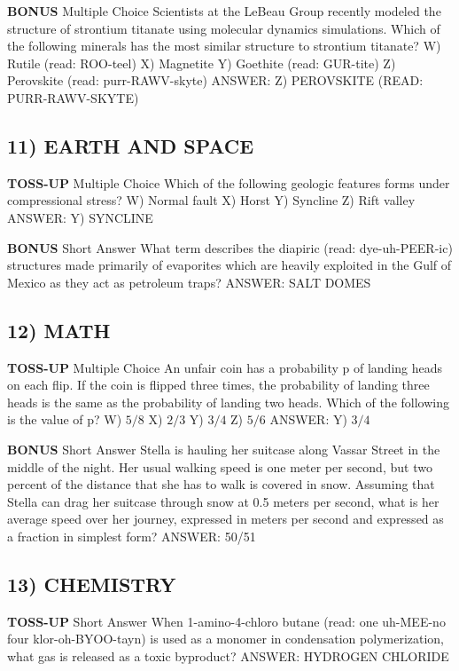 \documentclass{article}
\begin{document}
\textbf{BONUS}
Multiple Choice Scientists at the LeBeau Group recently modeled the structure of strontium titanate using molecular dynamics simulations. Which of the following minerals has the most similar structure to strontium titanate?
W) Rutile (read: ROO-teel)
X) Magnetite
Y) Goethite (read: GUR-tite)
Z) Perovskite (read: purr-RAWV-skyte)
ANSWER: Z) PEROVSKITE (READ: PURR-RAWV-SKYTE)

\subsection*{11) EARTH AND SPACE}
\textbf{TOSS-UP}
Multiple Choice Which of the following geologic features forms under compressional stress?
W) Normal fault
X) Horst
Y) Syncline
Z) Rift valley
ANSWER: Y) SYNCLINE

\textbf{BONUS}
Short Answer What term describes the diapiric (read: dye-uh-PEER-ic) structures made primarily of evaporites which are heavily exploited in the Gulf of Mexico as they act as petroleum traps?
ANSWER: SALT DOMES

\subsection*{12) MATH}
\textbf{TOSS-UP}
Multiple Choice An unfair coin has a probability p of landing heads on each flip. If the coin is flipped three times, the probability of landing three heads is the same as the probability of landing two heads. Which of the following is the value of p?
W) $5/8$
X) $2/3$
Y) $3/4$
Z) $5/6$
ANSWER: Y) $3/4$

\textbf{BONUS}
Short Answer Stella is hauling her suitcase along Vassar Street in the middle of the night. Her usual walking speed is one meter per second, but two percent of the distance that she has to walk is covered in snow. Assuming that Stella can drag her suitcase through snow at 0.5 meters per second, what is her average speed over her journey, expressed in meters per second and expressed as a fraction in simplest form?
ANSWER: 50/51

\subsection*{13) CHEMISTRY}
\textbf{TOSS-UP}
Short Answer When 1-amino-4-chloro butane (read: one uh-MEE-no four klor-oh-BYOO-tayn) is used as a monomer in condensation polymerization, what gas is released as a toxic byproduct?
ANSWER: HYDROGEN CHLORIDE
\end{document}
